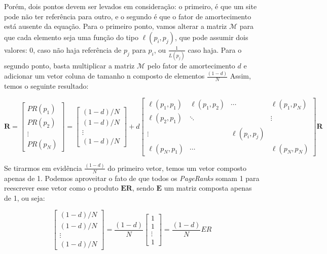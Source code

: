 \documentclass[11pt]{article}
\begin{document}
    Porém, dois pontos devem ser levados em consideração: o primeiro, é que
um site pode não ter referência para outro, e o segundo é que o fator de
amortecimento está ausente da equação. Para o primeiro ponto, vamos
alterar a matriz \(\mathcal {M}\) para que cada elemento seja uma função
do tipo \(\ell(p_i,p_j)\), que pode assumir dois valores: 0, caso não
haja referência de \(p_j\) para \(p_i\), ou \(\frac{1}{L(p_j)}\) caso
haja. Para o segundo ponto, basta multiplicar a matriz \(\mathcal {M}\)
pelo fator de amortecimento \(d\) e adicionar um vetor coluna de tamanho
n composto de elementos \(\frac{(1-d)}{N}\) Assim, temos o seguinte
resultado:

\[{\displaystyle \mathbf {R} = \begin{bmatrix}PR(p_{1})\\PR(p_{2})\\\vdots \\PR(p_{N})\end{bmatrix}  ={\begin{bmatrix}{(1-d)/N}\\{(1-d)/N}\\\vdots \\{(1-d)/N}\end{bmatrix}}+d{\begin{bmatrix}\ell (p_{1},p_{1})&\ell (p_{1},p_{2})&\cdots &\ell (p_{1},p_{N})\\\ell (p_{2},p_{1})&\ddots &&\vdots \\\vdots &&\ell (p_{i},p_{j})&\\\ell (p_{N},p_{1})&\cdots &&\ell (p_{N},p_{N})\end{bmatrix}}\mathbf {R} }\]

    Se tirarmos em evidência \(\frac{(1-d)}{N}\) do primeiro vetor, temos um
vetor composto apenas de 1. Podemos aproveitar o fato de que todos os
\emph{PageRanks} somam 1 para reescrever esse vetor como o produto
\(\mathbf {ER}\), sendo \(\mathbf {E}\) um matriz composta apenas de 1,
ou seja:

\[\displaystyle \begin{bmatrix}{(1-d)/N}\\{(1-d)/N}\\\vdots \\{(1-d)/N}\end{bmatrix} = \frac{(1-d)}{N}\begin{bmatrix}{1}\\{1}\\\vdots \\{1}\end{bmatrix} = \frac{(1-d)}{N}ER\]
\end{document}
